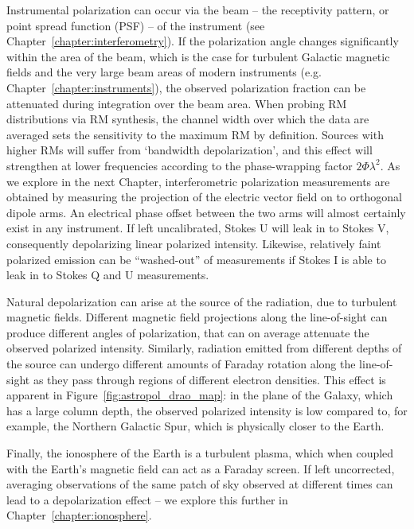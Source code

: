 Instrumental polarization can occur via the beam -- the receptivity pattern, or point spread function (PSF) -- of the instrument (see Chapter~\ref{chapter:interferometry}). If the polarization angle changes significantly within the area of the beam, which is the case for turbulent Galactic magnetic fields and the very large beam areas of modern instruments (e.g. Chapter~\ref{chapter:instruments}), the observed polarization fraction can be attenuated during integration over the beam area. 
When probing RM distributions via RM synthesis, the channel width over which the data are averaged sets the sensitivity to the maximum RM by definition. Sources with higher RMs will suffer from `bandwidth depolarization', and this effect will strengthen at lower frequencies according to the phase-wrapping factor $2\Phi\lambda^2$.
As we explore in the next Chapter, interferometric polarization measurements are obtained by measuring the projection of the electric vector field on to orthogonal dipole arms. An electrical phase offset between the two arms will almost certainly exist in any instrument. If left uncalibrated, Stokes U will leak in to Stokes V, consequently depolarizing linear polarized intensity. Likewise, relatively faint polarized emission can be ``washed-out'' of measurements if Stokes I is able to leak in to Stokes Q and U measurements.

Natural depolarization can arise at the source of the radiation, due to turbulent magnetic fields. Different magnetic field projections along the line-of-sight can produce different angles of polarization, that can on average attenuate the observed polarized intensity. Similarly, radiation emitted from different depths of the source can undergo different amounts of Faraday rotation along the line-of-sight as they pass through regions of different electron densities. This effect is apparent in Figure~\ref{fig:astropol_drao_map}: in the plane of the Galaxy, which has a large column depth, the observed polarized intensity is low compared to, for example, the Northern Galactic Spur, which is physically closer to the Earth. 

Finally, the ionosphere of the Earth is a turbulent plasma, which when coupled with the Earth's magnetic field can act as a Faraday screen. If left uncorrected, averaging observations of the same patch of sky observed at different times can lead to a depolarization effect -- we explore this further in Chapter~\ref{chapter:ionosphere}.

